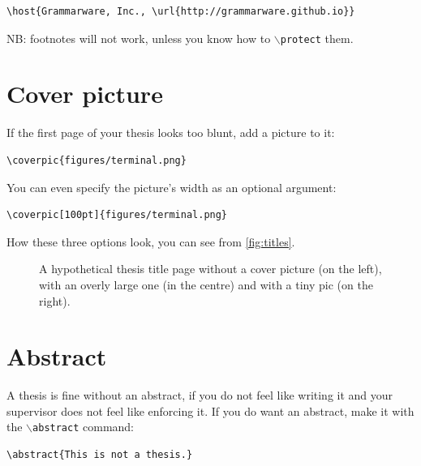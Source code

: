 \documentclass{uvamscse}
\newcommand{\cmd}[1]{\texttt{$\backslash$#1}}
\begin{document}
\begin{snippet}
\begin{verbatim}
\host{Grammarware, Inc., \url{http://grammarware.github.io}}
\end{verbatim}
\end{snippet}

NB: footnotes will not work, unless you know how to \cmd{protect} them.

\section{Cover picture}

If the first page of your thesis looks too blunt, add a picture to it:

\begin{snippet}
\begin{verbatim}
\coverpic{figures/terminal.png}
\end{verbatim}
\end{snippet}

You can even specify the picture's width as an optional argument:

\begin{snippet}
\begin{verbatim}
\coverpic[100pt]{figures/terminal.png}
\end{verbatim}
\end{snippet}

How these three options look, you can see from \autoref{fig:titles}.

\begin{figure}[t]
  \hfill
  \hfill
  \caption{A hypothetical thesis title page without a cover picture (on the left), with an overly large one (in the centre) and with a tiny pic (on the right).}
  \label{fig:titles}
\end{figure}

\section{Abstract}

A thesis is fine without an abstract, if you do not feel like writing it and
your supervisor does not feel like enforcing it. If you do want an abstract,
make it with the \cmd{abstract} command:

\begin{snippet}
\begin{verbatim}
\abstract{This is not a thesis.}
\end{verbatim}
\end{snippet}
\end{document}
